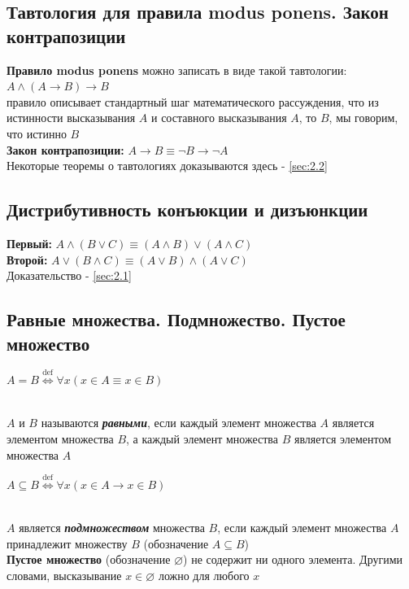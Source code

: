 \documentclass[a4paper]{article}
\begin{document}
\subsection{Тавтология для правила modus ponens. Закон контрапозиции}
\indent\textbf{Правило modus ponens} можно записать в виде такой тавтологии: $A\wedge (A\rightarrow B)\rightarrow B$\\[2mm]
 правило описывает стандартный шаг математического рассуждения, что из истинности высказывания $A$ и составного высказывания  $A$, то $B$\guillemotright, мы говорим, что истинно $B$\\[2mm]
\indent\textbf{Закон контрапозиции:} $A\rightarrow B\equiv\neg B\rightarrow\neg A$\\[2mm]
Некоторые теоремы о тавтологиях доказываются здесь - \ref{sec:2.2}
\subsection{Дистрибутивность конъюкции и дизъюнкции}
\textbf{Первый:} $A\wedge(B\vee C)\equiv(A\wedge B)\vee(A\wedge C)$\\[2mm]
\textbf{Второй:} $A\vee(B\wedge C)\equiv(A\vee B)\wedge(A\vee C)$\\[2mm]
Доказательство - \ref{sec:2.1}
\subsection{Равные множества. Подмножество. Пустое множество}
\indent\centerline{$A=B \stackrel{\text{def}}{\Leftrightarrow}\forall x(x\in A\equiv x\in B)$}\\[2mm]
 $A$ и $B$ называются \textbf{\textit{равными}}, если каждый элемент множества $A$ является элементом множества $B$, а каждый элемент множества $B$ является элементом множества $A$\\[2mm]
\centerline{$A\subseteq B \stackrel{\text{def}}{\Leftrightarrow}\forall x(x\in A\rightarrow x\in B)$}\\[2mm]
 $A$ является \textbf{\textit{подмножеством}} множества $B$, если каждый элемент множества $A$ принадлежит множеству $B$ (обозначение $A\subseteq B$)\\[2mm]
\indent\textbf{Пустое множество} (обозначение $\varnothing$) не содержит ни одного элемента.
Другими словами, высказывание $x\in\varnothing$ ложно для любого $x$
\end{document}
